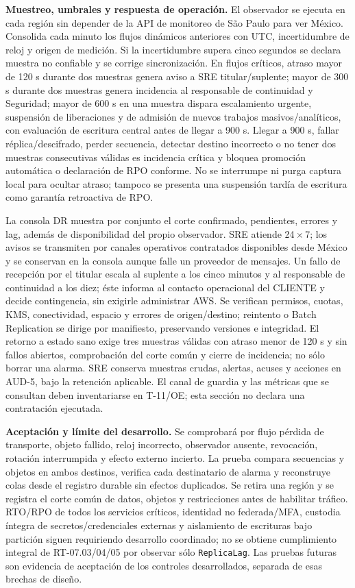 \textbf{Muestreo, umbrales y respuesta de operación.} El observador se ejecuta en cada región sin depender de la API de monitoreo de São Paulo para ver México. Consolida cada minuto los flujos dinámicos anteriores con UTC, incertidumbre de reloj y origen de medición. Si la incertidumbre supera cinco segundos se declara muestra no confiable y se corrige sincronización. En flujos críticos, atraso mayor de 120 s durante dos muestras genera aviso a SRE titular/suplente; mayor de 300 s durante dos muestras genera incidencia al responsable de continuidad y Seguridad; mayor de 600 s en una muestra dispara escalamiento urgente, suspensión de liberaciones y de admisión de nuevos trabajos masivos/analíticos, con evaluación de escritura central antes de llegar a 900 s. Llegar a 900 s, fallar réplica/descifrado, perder secuencia, detectar destino incorrecto o no tener dos muestras consecutivas válidas es incidencia crítica y bloquea promoción automática o declaración de RPO conforme. No se interrumpe ni purga captura local para ocultar atraso; tampoco se presenta una suspensión tardía de escritura como garantía retroactiva de RPO.

La consola DR muestra por conjunto el corte confirmado, pendientes, errores y lag, además de disponibilidad del propio observador. SRE atiende 24\,$\times$\,7; los avisos se transmiten por canales operativos contratados disponibles desde México y se conservan en la consola aunque falle un proveedor de mensajes. Un fallo de recepción por el titular escala al suplente a los cinco minutos y al responsable de continuidad a los diez; éste informa al contacto operacional del CLIENTE y decide contingencia, sin exigirle administrar AWS. Se verifican permisos, cuotas, KMS, conectividad, espacio y errores de origen/destino; reintento o Batch Replication se dirige por manifiesto, preservando versiones e integridad. El retorno a estado sano exige tres muestras válidas con atraso menor de 120 s y sin fallos abiertos, comprobación del corte común y cierre de incidencia; no sólo borrar una alarma. SRE conserva muestras crudas, alertas, acuses y acciones en AUD-5, bajo la retención aplicable. El canal de guardia y las métricas que se consultan deben inventariarse en T-11/OE; esta sección no declara una contratación ejecutada.

\textbf{Aceptación y límite del desarrollo.} Se comprobará por flujo pérdida de transporte, objeto fallido, reloj incorrecto, observador ausente, revocación, rotación interrumpida y efecto externo incierto. La prueba compara secuencias y objetos en ambos destinos, verifica cada destinatario de alarma y reconstruye colas desde el registro durable sin efectos duplicados. Se retira una región y se registra el corte común de datos, objetos y restricciones antes de habilitar tráfico. RTO/RPO de todos los servicios críticos, identidad no federada/MFA, custodia íntegra de secretos/credenciales externas y aislamiento de escrituras bajo partición siguen requiriendo desarrollo coordinado; no se obtiene cumplimiento integral de RT-07.03/04/05 por observar sólo \texttt{ReplicaLag}. Las pruebas futuras son evidencia de aceptación de los controles desarrollados, separada de esas brechas de diseño.
